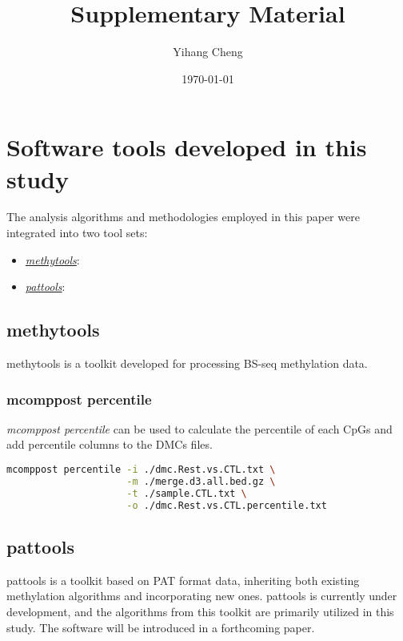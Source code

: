 \documentclass[10pt]{article}
\title{Supplementary Material}
\author{Yihang Cheng}
\date{\today}
\begin{document}
\maketitle
\newpage
\tableofcontents
\newpage
\section{Software tools developed in this study}\label{sec:software-develope}
The analysis algorithms and methodologies employed in this paper were integrated into two tool sets:

\begin{itemize}
    \item  \href{https://github.com/hcyvan/epiLungCancer/tree/main/methytools}{\textit{methytools}}: 
    \item \href{https://github.com/hcyvan/pattools}{\textit{pattools}}: 
\end{itemize}

\subsection{methytools}\label{sec:software-develope-methytools}

methytools is a toolkit developed for processing BS-seq methylation data.

\subsubsection{mcomppost percentile}

\emph{mcomppost percentile} can be used to calculate the percentile of each CpGs and add percentile columns to the DMCs files.

\begin{lstlisting}[language=sh, caption={}]
mcomppost percentile -i ./dmc.Rest.vs.CTL.txt \
                     -m ./merge.d3.all.bed.gz \
                     -t ./sample.CTL.txt \
                     -o ./dmc.Rest.vs.CTL.percentile.txt
\end{lstlisting}

\subsection{pattools}\label{sec:software-develope-pattools}

pattools is a toolkit based on PAT format\cite{Loyfer2024.05.08.593132} data, inheriting both existing methylation algorithms and incorporating new ones.
{pattools} is currently under development, and the algorithms from this toolkit are primarily utilized in this study. The
 software will be introduced in a forthcoming paper.
\end{document}
